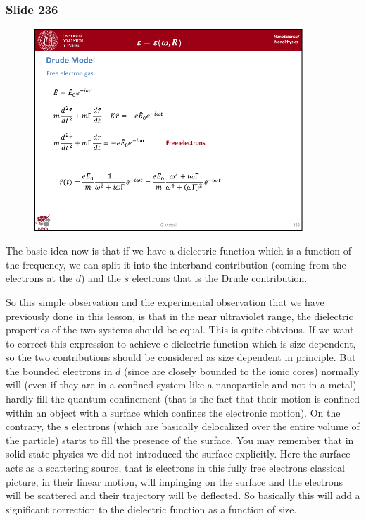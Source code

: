 \documentclass[../main/main.tex]{subfiles}
\begin{document}
\newpage

\subsubsection{Slide 236}

\begin{figure}[h!]
\centering
\includegraphics[page=9,width=0.9\textwidth]{../lessons/pdf_file/15_lesson.pdf}
\end{figure}

The basic idea now is that if we have a dielectric function which is a function of the frequency, we can split it into the interband contribution (coming from the electrons at the \( d \)) and the \( s \) electrons that is the Drude contribution.

So this simple observation and the experimental observation that we have previously done in this lesson, is that in the near ultraviolet range, the dielectric properties of the two systems should be equal. This is quite obtvious. If we want to correct this expression to achieve e dielectric function which is size dependent, so the two contributions should be considered as size dependent in principle. But the bounded electrons in \( d \) (since are closely bounded to the ionic cores) normally will (even if they are in a confined system like a nanoparticle and not in a metal) hardly fill the quantum confinement (that is the fact that their motion is confined within an object with a surface which confines the electronic motion). On the contrary, the \( s \) electrons (which are basically delocalized over the entire volume of the particle) starts to fill the presence of the surface.
You may remember that in solid state physics we did not introduced the surface explicitly. Here the surface acts as a scattering source, that is electrons in this fully free electrons classical picture, in their linear motion, will impinging on the surface and the electrons will be scattered and their trajectory will be deflected. So basically this will add a significant correction to the dielectric function as a function of size.
\end{document}
